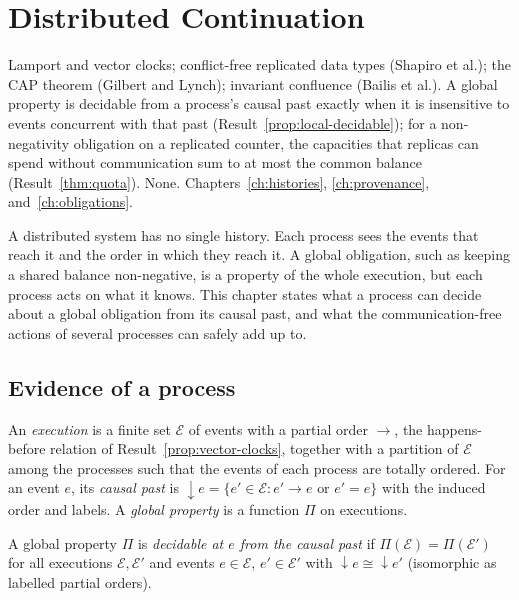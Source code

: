 \chapter{Distributed Continuation}\label{ch:distributed}
{Lamport and vector clocks; conflict-free replicated data types (Shapiro et al.); the CAP theorem (Gilbert and Lynch); invariant confluence (Bailis et al.).}
{A global property is decidable from a process's causal past exactly when it is insensitive to events concurrent with that past (Result~\ref{prop:local-decidable}); for a non-negativity obligation on a replicated counter, the capacities that replicas can spend without communication sum to at most the common balance (Result~\ref{thm:quota}).}
{None.}
{Chapters~\ref{ch:histories}, \ref{ch:provenance}, and~\ref{ch:obligations}.}

A distributed system has no single history. Each process sees the events that reach it and the order in which they reach it. A global obligation, such as keeping a shared balance non-negative, is a property of the whole execution, but each process acts on what it knows. This chapter states what a process can decide about a global obligation from its causal past, and what the communication-free actions of several processes can safely add up to.

\section{Evidence of a process}

An \emph{execution} is a finite set $\mathcal E$ of events with a partial order $\to$, the happens-before relation of Result~\ref{prop:vector-clocks}, together with a partition of $\mathcal E$ among the processes such that the events of each process are totally ordered. For an event $e$, its \emph{causal past} is $\downarrow e=\{e'\in\mathcal E:e'\to e\text{ or }e'=e\}$ with the induced order and labels. A \emph{global property} is a function $\Pi$ on executions.

\begin{definition}\label{def:local}
A global property $\Pi$ is \emph{decidable at $e$ from the causal past} if $\Pi(\mathcal E)=\Pi(\mathcal E')$ for all executions $\mathcal E,\mathcal E'$ and events $e\in\mathcal E$, $e'\in\mathcal E'$ with $\downarrow e\cong{\downarrow e'}$ (isomorphic as labelled partial orders).
\end{definition}

